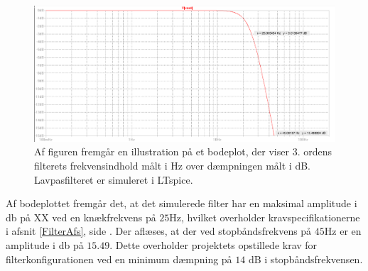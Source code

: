 \begin{figure}[H]
	\centering
	\includegraphics[scale=0.4]{figures/cProblemloesning/Lavpasfiltergraf_LTspice1.PNG}
	\caption{Af figuren fremgår en illustration på et bodeplot, der viser 3. ordens filterets frekvensindhold målt i Hz over dæmpningen målt i dB. Lavpasfilteret er simuleret i LTspice.}
	\label{fig:lavpasfilter_LTspice}
\end{figure}

Af bodeplottet fremgår det, at det simulerede filter har en maksimal amplitude i db på XX  ved en knækfrekvens på $25$Hz, hvilket overholder kravspecifikationerne i afsnit \ref{FilterAfs}, side \pageref{FilterAfs}. Der aflæses, at der ved stopbåndsfrekvens på $45$Hz er en amplitude i db på $15.49$. Dette overholder projektets opstillede krav for filterkonfigurationen ved en minimum dæmpning på $14$ dB i stopbåndsfrekvensen.  


